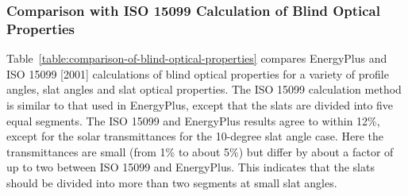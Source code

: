 \subsubsection{Comparison with ISO 15099 Calculation of Blind Optical Properties}\label{comparison-with-iso-15099-calculation-of-blind-optical-properties}

Table~\ref{table:comparison-of-blind-optical-properties} compares EnergyPlus and ISO 15099 {[}2001{]} calculations of blind optical properties for a variety of profile angles, slat angles and slat optical properties. The ISO 15099 calculation method is similar to that used in EnergyPlus, except that the slats are divided into five equal segments. The ISO 15099 and EnergyPlus results agree to within 12\%, except for the solar transmittances for the 10-degree slat angle case. Here the transmittances are small (from 1\% to about 5\%) but differ by about a factor of up to two between ISO 15099 and EnergyPlus. This indicates that the slats should be divided into more than two segments at small slat angles.

